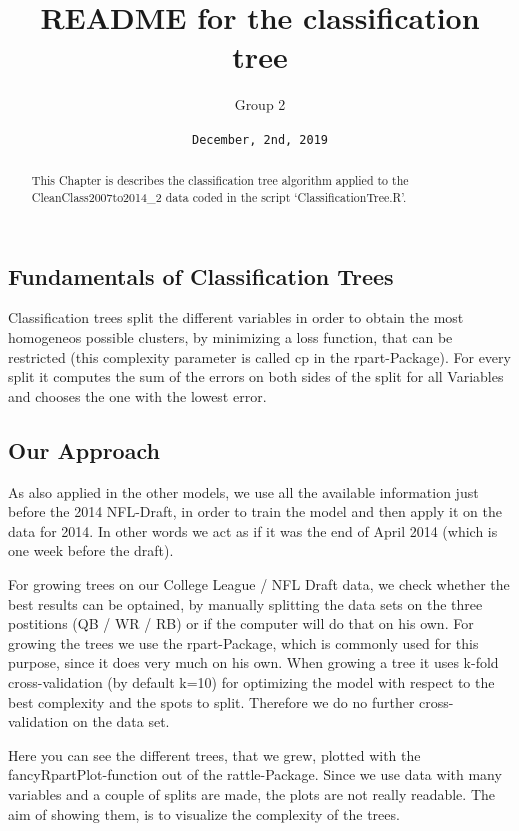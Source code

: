 \documentclass[]{article}
\title{README for the classification tree}
\author{Group 2}
\date{\texttt{December,\ 2nd,\ 2019}}
\begin{document}
\maketitle
\begin{abstract}
This Chapter is describes the classification tree algorithm applied to
the CleanClass2007to2014\_2 data coded in the script
`ClassificationTree.R'.
\end{abstract}

\hypertarget{fundamentals-of-classification-trees}{%
\subsection{Fundamentals of Classification
Trees}\label{fundamentals-of-classification-trees}}

Classification trees split the different variables in order to obtain
the most homogeneos possible clusters, by minimizing a loss function,
that can be restricted (this complexity parameter is called cp in the
rpart-Package). For every split it computes the sum of the errors on
both sides of the split for all Variables and chooses the one with the
lowest error.

\hypertarget{our-approach}{%
\subsection{Our Approach}\label{our-approach}}

As also applied in the other models, we use all the available
information just before the 2014 NFL-Draft, in order to train the model
and then apply it on the data for 2014. In other words we act as if it
was the end of April 2014 (which is one week before the draft).

For growing trees on our College League / NFL Draft data, we check
whether the best results can be optained, by manually splitting the data
sets on the three postitions (QB / WR / RB) or if the computer will do
that on his own. For growing the trees we use the rpart-Package, which
is commonly used for this purpose, since it does very much on his own.
When growing a tree it uses k-fold cross-validation (by default k=10)
for optimizing the model with respect to the best complexity and the
spots to split. Therefore we do no further cross-validation on the data
set.

Here you can see the different trees, that we grew, plotted with the
fancyRpartPlot-function out of the rattle-Package. Since we use data
with many variables and a couple of splits are made, the plots are not
really readable. The aim of showing them, is to visualize the complexity
of the trees.
\end{document}
